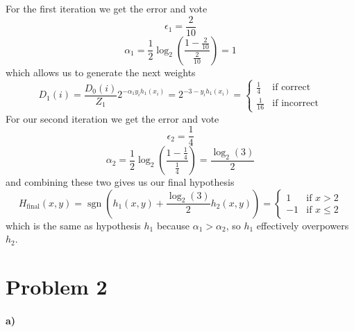 \documentclass[12pt]{article}
\begin{document}
For the first iteration we get the error and vote
\[\epsilon_1 = \frac{2}{10}\]
\[\alpha_1 = \frac{1}{2}\log_2\left(\frac{1-\frac{2}{10}}{\frac{2}{10}}\right) = 1\]
which allows us to generate the next weights
\[D_1(i)=\frac{D_0(i)}{Z_1}2^{-\alpha_1y_ih_1(x_i)}=2^{-3-y_ih_1(x_i)}=\begin{cases}\frac{1}{4}&\text{if correct}\\ \frac{1}{16}&\text{if incorrect}\end{cases}\]
For our second iteration we get the error and vote
\[\epsilon_2 = \frac{1}{4}\]
\[\alpha_2 = \frac{1}{2}\log_2\left(\frac{1-\frac{1}{4}}{\frac{1}{4}}\right) = \frac{\log_2(3)}{2}\]
and combining these two gives us our final hypothesis
\[H_\text{final}(x,y)=\operatorname{sgn}\left(h_1(x,y)+\frac{\log_2(3)}{2}h_2(x,y)\right)=\begin{cases}1&\text{if }x>2\\ -1&\text{if }x\leq 2\end{cases}\]
which is the same as hypothesis \(h_1\) because \(\alpha_1>\alpha_2\), so \(h_1\) effectively overpowers \(h_2\).

\section*{Problem 2}

\paragraph{a)}
\end{document}
